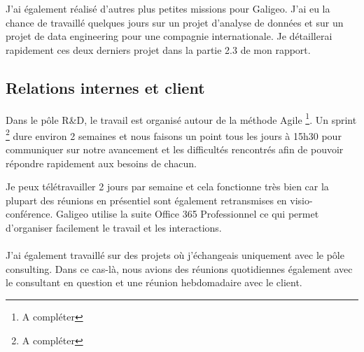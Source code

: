 J’ai également réalisé d’autres plus petites missions pour Galigeo. J’ai eu la chance de travaillé quelques jours sur un projet d’analyse de données et sur un projet de data engineering pour une compagnie internationale. Je détaillerai rapidement ces deux derniers projet dans la partie 2.3 de mon rapport.


\subsection{Relations internes et client}

Dans le pôle R\&D, le travail est organisé autour de la méthode Agile \footnote{A compléter}. Un sprint \footnote{A compléter} dure environ 2 semaines et nous faisons un point tous les jours à 15h30 pour communiquer sur notre avancement et les difficultés rencontrés afin de pouvoir répondre rapidement aux besoins de chacun.

Je peux télétravailler 2 jours par semaine et cela fonctionne très bien car la plupart des réunions en présentiel sont également retransmises en visio-conférence. Galigeo utilise la suite Office 365 Professionnel ce qui permet d’organiser facilement le travail et les interactions.

\paragraph*{}

J’ai également travaillé sur des projets où j’échangeais uniquement avec le pôle consulting. Dans ce cas-là, nous avions des réunions quotidiennes également avec le consultant en question et une réunion hebdomadaire avec le client.
